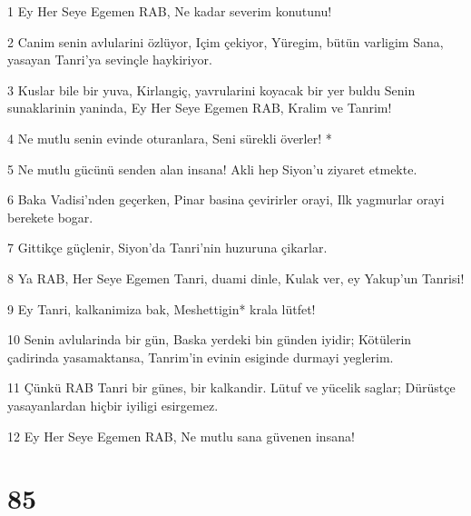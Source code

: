 \par 1 Ey Her Seye Egemen RAB, Ne kadar severim konutunu!
\par 2 Canim senin avlularini özlüyor, Içim çekiyor, Yüregim, bütün varligim Sana, yasayan Tanri'ya sevinçle haykiriyor.
\par 3 Kuslar bile bir yuva, Kirlangiç, yavrularini koyacak bir yer buldu Senin sunaklarinin yaninda, Ey Her Seye Egemen RAB, Kralim ve Tanrim!
\par 4 Ne mutlu senin evinde oturanlara, Seni sürekli överler! *
\par 5 Ne mutlu gücünü senden alan insana! Akli hep Siyon'u ziyaret etmekte.
\par 6 Baka Vadisi'nden geçerken, Pinar basina çevirirler orayi, Ilk yagmurlar orayi berekete bogar.
\par 7 Gittikçe güçlenir, Siyon'da Tanri'nin huzuruna çikarlar.
\par 8 Ya RAB, Her Seye Egemen Tanri, duami dinle, Kulak ver, ey Yakup'un Tanrisi!
\par 9 Ey Tanri, kalkanimiza bak, Meshettigin* krala lütfet!
\par 10 Senin avlularinda bir gün, Baska yerdeki bin günden iyidir; Kötülerin çadirinda yasamaktansa, Tanrim'in evinin esiginde durmayi yeglerim.
\par 11 Çünkü RAB Tanri bir günes, bir kalkandir. Lütuf ve yücelik saglar; Dürüstçe yasayanlardan hiçbir iyiligi esirgemez.
\par 12 Ey Her Seye Egemen RAB, Ne mutlu sana güvenen insana!

\chapter{85}

